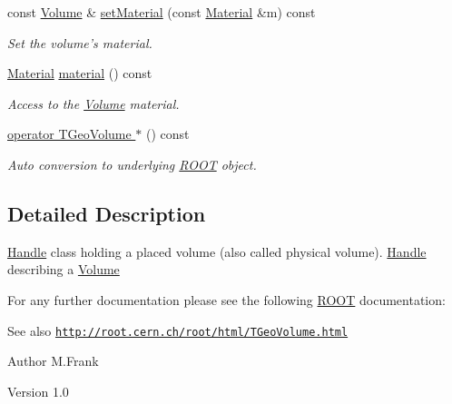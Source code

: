 \begin{DoxyCompactItemize}
const \hyperlink{class_d_d4hep_1_1_geometry_1_1_volume}{Volume} \& \hyperlink{class_d_d4hep_1_1_geometry_1_1_volume_a65caa62ff7fbf16f38cb85af994944c7}{setMaterial} (const \hyperlink{class_d_d4hep_1_1_geometry_1_1_material}{Material} \&m) const 
\begin{DoxyCompactList}\small\item\em Set the volume's material. \item\end{DoxyCompactList}\item 
\hyperlink{class_d_d4hep_1_1_geometry_1_1_material}{Material} \hyperlink{class_d_d4hep_1_1_geometry_1_1_volume_ab27715df3e7b1b8f36ca802e6d894005}{material} () const 
\begin{DoxyCompactList}\small\item\em Access to the \hyperlink{class_d_d4hep_1_1_geometry_1_1_volume}{Volume} material. \item\end{DoxyCompactList}\item 
\hyperlink{class_d_d4hep_1_1_geometry_1_1_volume_ae810687dc4b2e3ad5e9a99290eb88ce5}{operator TGeoVolume $\ast$} () const 
\begin{DoxyCompactList}\small\item\em Auto conversion to underlying \hyperlink{namespace_r_o_o_t}{ROOT} object. \item\end{DoxyCompactList}\end{DoxyCompactItemize}


\subsection{Detailed Description}
\hyperlink{class_d_d4hep_1_1_handle}{Handle} class holding a placed volume (also called physical volume). \hyperlink{class_d_d4hep_1_1_handle}{Handle} describing a \hyperlink{class_d_d4hep_1_1_geometry_1_1_volume}{Volume}

For any further documentation please see the following \hyperlink{namespace_r_o_o_t}{ROOT} documentation: \begin{DoxySeeAlso}{See also}
\href{http://root.cern.ch/root/html/TGeoVolume.html}{\tt http://root.cern.ch/root/html/TGeoVolume.html}
\end{DoxySeeAlso}
\begin{DoxyAuthor}{Author}
M.Frank 
\end{DoxyAuthor}
\begin{DoxyVersion}{Version}
1.0 
\end{DoxyVersion}



